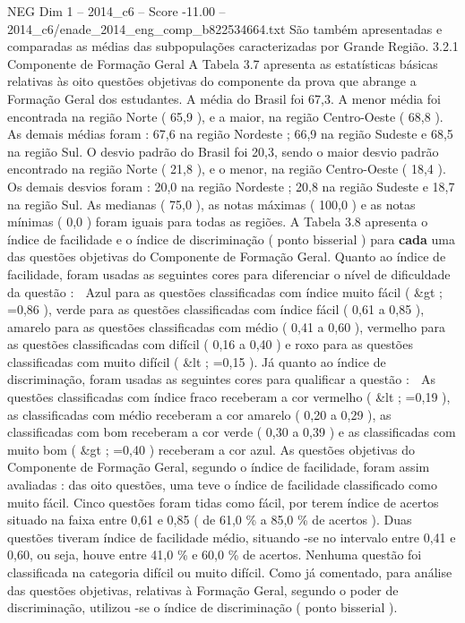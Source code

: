 \begin{textsample}{NEG Dim 1 – 2014\_c6 – Score -11.00 – 2014\_c6/enade\_2014\_eng\_comp\_b822534664.txt}
São também apresentadas e comparadas as médias das subpopulações caracterizadas por Grande Região. 3.2.1 Componente de Formação Geral A Tabela 3.7 apresenta as estatísticas básicas relativas às oito questões objetivas do componente da prova que abrange a Formação Geral dos estudantes.
A média do Brasil foi 67,3.
A menor média foi encontrada na região Norte ( 65,9 ), e a maior, na região Centro-Oeste ( 68,8 ).
As demais médias foram : 67,6 na região Nordeste ; 66,9 na região Sudeste e 68,5 na região Sul.
O desvio padrão do Brasil foi 20,3, sendo o maior desvio padrão encontrado na região Norte ( 21,8 ), e o menor, na região Centro-Oeste ( 18,4 ).
Os demais desvios foram : 20,0 na região Nordeste ; 20,8 na região Sudeste e 18,7 na região Sul.
As medianas ( 75,0 ), as notas máximas ( 100,0 ) e as notas mínimas ( 0,0 ) foram iguais para todas as regiões.
A Tabela 3.8 apresenta o índice de facilidade e o índice de discriminação ( ponto bisserial ) para \textbf{cada} uma das questões objetivas do Componente de Formação Geral.
Quanto ao índice de facilidade, foram usadas as seguintes cores para diferenciar o nível de dificuldade da questão :  Azul para as questões classificadas com índice muito fácil ( \&gt ; =0,86 ), verde para as questões classificadas com índice fácil ( 0,61 a 0,85 ), amarelo para as questões classificadas com médio ( 0,41 a 0,60 ), vermelho para as questões classificadas com difícil ( 0,16 a 0,40 ) e roxo para as questões classificadas com muito difícil ( \&lt ; =0,15 ).
Já quanto ao índice de discriminação, foram usadas as seguintes cores para qualificar a questão :  As questões classificadas com índice fraco receberam a cor vermelho ( \&lt ; =0,19 ), as classificadas com médio receberam a cor amarelo ( 0,20 a 0,29 ), as classificadas com bom receberam a cor verde ( 0,30 a 0,39 ) e as classificadas com muito bom ( \&gt ; =0,40 ) receberam a cor azul.
As questões objetivas do Componente de Formação Geral, segundo o índice de facilidade, foram assim avaliadas : das oito questões, uma teve o índice de facilidade classificado como muito fácil.
Cinco questões foram tidas como fácil, por terem índice de acertos situado na faixa entre 0,61 e 0,85 ( de 61,0 \% a 85,0 \% de acertos ).
Duas questões tiveram índice de facilidade médio, situando -se no intervalo entre 0,41 e 0,60, ou seja, houve entre 41,0 \% e 60,0 \% de acertos.
Nenhuma questão foi classificada na categoria difícil ou muito difícil.
Como já comentado, para análise das questões objetivas, relativas à Formação Geral, segundo o poder de discriminação, utilizou -se o índice de discriminação ( ponto bisserial ).

\end{textsample}
